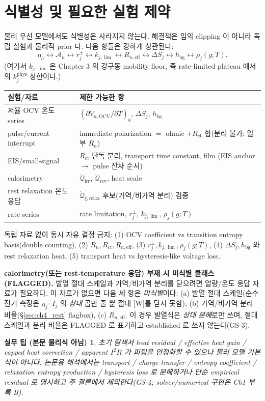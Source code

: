 \documentclass[11pt,a4paper]{article}
\newtheorem*{practicebox}{실무 팁 (본문 물리식 아님)}
\newcommand{\eff}{\mathrm{eff}}
\newcommand{\bg}{\mathrm{bg}}
\newcommand{\OCV}{\mathrm{OCV}}
\newcommand{\irr}{\mathrm{irr}}
\newcommand{\rev}{\mathrm{rev}}
\newcommand{\ct}{\mathrm{ct}}
\newcommand{\rlx}{\mathrm{relax}}
\begin{document}
\section{식별성 및 필요한 실험 제약}\label{sec:ch4_ident}
물리 우선 모델에서도 식별성은 사라지지 않는다. 해결책은 임의 clipping 이 아니라 독립 실험과 물리적 prior 다.
다음 항들은 강하게 상관된다:
\begin{equation}
\eta_n\leftrightarrow\mathcal A_n\leftrightarrow r_j^\pm\leftrightarrow k_{j,\lim}\leftrightarrow R_{n,\eff}\leftrightarrow\Delta S_j\leftrightarrow h_\bg\leftrightarrow\rho_j(g;T).
\label{eq:ch4_ident}
\end{equation}
(여기서 $k_{j,\lim}$ 은 Chapter 3 의 강구동 mobility floor, 즉 rate-limited plateau 에서의 $k_j^{\mathrm{phys}}$
상한이다.)
\begin{longtable}{p{} >{\raggedright\arraybackslash}p{}}
\toprule 실험/자료 & 제한 가능한 항 \\ \midrule \endhead
저율 OCV 온도 series & $(\partial V_{n,\OCV}/\partial T)_q$, $\Delta S_j$, $h_\bg$ \\
pulse/current interrupt & immediate polarization $=$ ohmic $+R_\ct$ 합(분리 불가; 일부 $R_n$) \\
EIS/small-signal & $R_\ct$ 단독 분리, transport time constant, film (EIS anchor $\to$ pulse 잔차 순서) \\
calorimetry & $\dot{\mathcal Q}_{\irr}$, $\dot{\mathcal Q}_{\rev}$, heat scale \\
rest relaxation 온도 응답 & $\dot{\mathcal Q}_{\xi,\rlx}$ 후보(가역/비가역 분리) 검증 \\
rate series & rate limitation, $r_j^\pm$, $k_{j,\lim}$, $\rho_j(g;T)$ \\
\bottomrule
\end{longtable}
독립 자료 없이 동시 자유 결정 금지: (1) OCV coefficient vs transition entropy basis(double counting),
(2) $R_n,R_\ct,R_{n,\eff}$, (3) $r_j^\pm,k_{j,\lim},\rho_j(g;T)$, (4) $\Delta S_j,h_\bg$ 와 rest relaxation
heat, (5) transport heat vs hysteresis-like voltage loss.

\textbf{calorimetry(또는 rest-temperature 응답) 부재 시 미식별 클래스(FLAGGED).} 발열 절대 스케일과 가역/비가역
분리를 닫으려면 열량/온도 응답 자료가 필요하다. 이 자료가 없으면 다음 세 항은 \emph{미식별}이다: (a) 발열 절대
스케일(순수 전기 측정은 $\eta_j\cdot I_j$ 의 \emph{상대} 곱만 줄 뿐 절대 [W]를 닫지 못함), (b) 가역/비가역 분리
비율(\S\ref{sec:ch4_rest} flagbox), (c) $R_{n,\eff}$. 이 경우 발열식은 \emph{상대 분해}로만 쓰며, 절대 스케일과
분리 비율은 FLAGGED 로 표기하고 established 로 쓰지 않는다(GS-3).
\begin{practicebox}
초기 탐색서 heat residual / effective heat gain / capped heat correction / apparent $I^2R$ 가 피팅을
안정화할 수 있으나 \emph{물리 모델 기본식이 아니다}. 논문용 해석에서는 transport / charge-transfer / entropy
coefficient / relaxation entropy production / hysteresis loss 로 분해하거나 단순 empirical residual 로 명시하고
주 결론에서 제외한다(GS-4; solver/numerical 구현은 Ch1 부록 B).
\end{practicebox}
\end{document}
